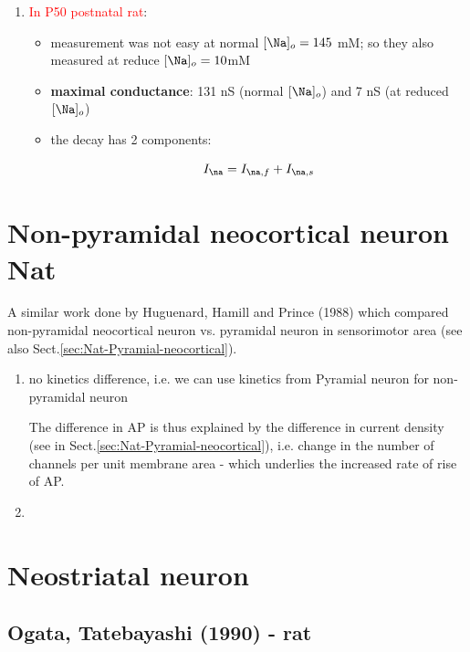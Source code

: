 \begin{enumerate}
  \item \textcolor{red}{In P50 postnatal rat}:
  \begin{itemize}
    \item measurement was not easy at normal $[\Na]_o =145$ mM; so they also
    measured at reduce $[\Na]_o = 10 $mM
    
    \item {\bf maximal conductance}: 131 nS (normal $[\Na]_o$) and 7 nS (at
    reduced $[\Na]_o$)
    
    \item the decay has 2 components: 
    
\begin{equation}
I_\na = I_{\na,f} + I_{\na,s}
\end{equation}


  \end{itemize}
  
\end{enumerate}

\section{Non-pyramidal neocortical neuron Nat}


A similar work done by Huguenard, Hamill and Prince (1988) which compared
non-pyramidal neocortical neuron vs. pyramidal neuron in sensorimotor
area (see also Sect.\ref{sec:Nat-Pyramial-neocortical}).
\begin{enumerate}
  \item no kinetics difference, i.e. we can use kinetics from Pyramial neuron
  for non-pyramidal neuron
  
  The difference in AP is thus explained by the difference in current density
  (see in Sect.\ref{sec:Nat-Pyramial-neocortical}), i.e. change in the number of
  channels per unit membrane area - which underlies the increased rate of rise of AP.
  
  
  \item 
\end{enumerate}

\section{Neostriatal neuron}

\subsection{Ogata, Tatebayashi (1990) - rat}

